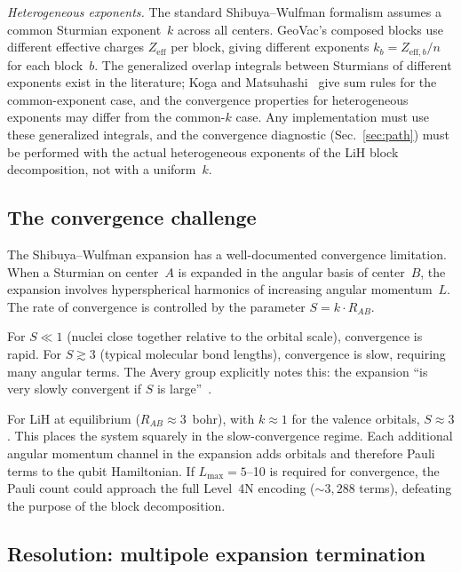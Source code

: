 \documentclass[aps,pra,twocolumn,superscriptaddress,longbibliography]{revtex4-2}
\begin{document}
\emph{Heterogeneous exponents.}  The standard Shibuya--Wulfman
formalism assumes a common Sturmian exponent~$k$ across all centers.
GeoVac's composed blocks use different effective charges
$Z_{\mathrm{eff}}$ per block, giving different exponents
$k_b = Z_{\mathrm{eff},b}/n$ for each block~$b$.  The generalized
overlap integrals between Sturmians of different exponents exist in
the literature; Koga and Matsuhashi~\cite{koga1987} give sum rules
for the common-exponent case, and the convergence properties for
heterogeneous exponents may differ from the common-$k$ case.  Any implementation must use these generalized
integrals, and the convergence diagnostic (Sec.~\ref{sec:path})
must be performed with the actual heterogeneous exponents of the
LiH block decomposition, not with a uniform~$k$.

\subsection{The convergence challenge}

The Shibuya--Wulfman expansion has a well-documented convergence
limitation.  When a Sturmian on center~$A$ is expanded in the
angular basis of center~$B$, the expansion involves hyperspherical
harmonics of increasing angular momentum~$L$.  The rate of convergence
is controlled by the parameter $S = k \cdot R_{AB}$.

For $S \ll 1$ (nuclei close together relative to the orbital scale),
convergence is rapid.  For $S \gtrsim 3$ (typical molecular bond
lengths), convergence is slow, requiring many angular terms.  The
Avery group explicitly notes this: the expansion ``is very slowly
convergent if $S$ is large''~\cite{avery2012}.

For LiH at equilibrium ($R_{AB} \approx 3$~bohr), with $k \approx 1$
for the valence orbitals, $S \approx 3$.  This places the system
squarely in the slow-convergence regime.  Each additional angular
momentum channel in the expansion adds orbitals and therefore Pauli
terms to the qubit Hamiltonian.  If $L_{\max} = 5$--10 is required
for convergence, the Pauli count could approach the full Level~4N
encoding (${\sim}3{,}288$ terms), defeating the purpose of the block
decomposition.

\subsection{Resolution: multipole expansion termination}
\label{sec:multipole_resolution}
\end{document}
